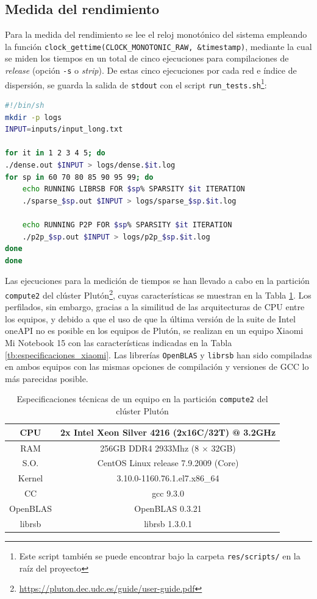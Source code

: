 \subsection{Medida del rendimiento}
\label{ssec:medida_rendimiento_metodologia}
Para la medida del rendimiento se lee el reloj monotónico del sistema empleando la función \texttt{clock\_gettime(CLOCK\_MONOTONIC\_RAW, \&timestamp)}, mediante la cual se miden los tiempos en un total de cinco ejecuciones para compilaciones de \textit{release} (opción \texttt{-s} o \textit{strip}). De estas cinco ejecuciones por cada red e índice de dispersión, se guarda la salida de \texttt{stdout} con el script \texttt{run\_tests.sh}\footnote{Este script también se puede encontrar bajo la carpeta \texttt{res/scripts/} en la raíz del proyecto}:\medskip
\begin{lstlisting}[language=bash]
#!/bin/sh
mkdir -p logs
INPUT=inputs/input_long.txt

for it in 1 2 3 4 5; do
./dense.out $INPUT > logs/dense.$it.log
for sp in 60 70 80 85 90 95 99; do
    echo RUNNING LIBRSB FOR $sp% SPARSITY $it ITERATION
    ./sparse_$sp.out $INPUT > logs/sparse_$sp.$it.log

    echo RUNNING P2P FOR $sp% SPARSITY $it ITERATION
    ./p2p_$sp.out $INPUT > logs/p2p_$sp.$it.log
done
done  
\end{lstlisting}

Las ejecuciones para la medición de tiempos se han llevado a cabo en la partición \texttt{compute2} del clúster Plutón\footnote{\url{https://pluton.dec.udc.es/guide/user-guide.pdf}}, cuyas características se muestran en la Tabla \ref{tb:especificaciones_compute2}. Los perfilados, sin embargo, gracias a la similitud de las arquitecturas de CPU entre los equipos, y debido a que el uso de que la última versión de la suite de Intel oneAPI no es posible en los equipos de Plutón, se realizan en un equipo Xiaomi Mi Notebook 15 con las características indicadas en la Tabla \ref{tb:especificaciones_xiaomi}. Las librerías \texttt{OpenBLAS} y \texttt{librsb} han sido compiladas en ambos equipos con las mismas opciones de compilación y versiones de GCC lo más parecidas posible.
\begin{table}[htpb]
\centering
\begin{tabular}{|c|c|}
    \hline
    CPU & 2x Intel Xeon Silver 4216 (2x16C/32T) @ 3.2GHz\\\hline
    RAM & 256GB DDR4 2933Mhz (8 $\times$ 32GB)\\\hline
    S.O. & CentOS Linux release 7.9.2009 (Core) \\\hline
    Kernel & 3.10.0-1160.76.1.el7.x86\_64 \\\hline
    CC & gcc 9.3.0\\\hline
    OpenBLAS & OpenBLAS 0.3.21\\\hline
    librsb & librsb 1.3.0.1\\\hline
\end{tabular}
\caption{\label{tb:especificaciones_compute2}Especificaciones técnicas de un equipo en la partición \texttt{compute2} del clúster Plutón}
\end{table}

